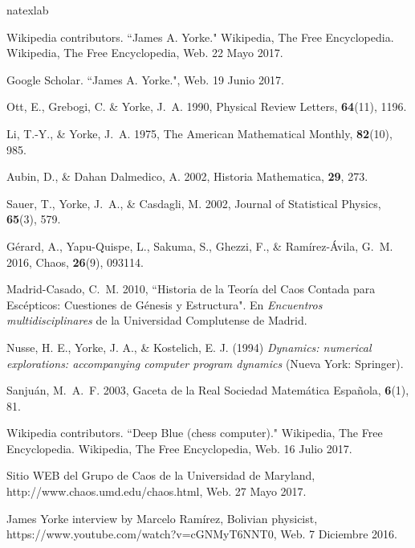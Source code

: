 \documentclass{rbf}
\begin{document}
\begin{thebibliography}{32}
\expandafter\ifx\csname natexlab\endcsname\relax\def\natexlab#1{#1}\fi

Wikipedia contributors. ``James A. Yorke." Wikipedia, The Free Encyclopedia. Wikipedia, The Free Encyclopedia, Web. 22 Mayo 2017.

Google Scholar. ``James A. Yorke.", Web. 19 Junio 2017.

Ott, E., Grebogi, C. \& Yorke, J.~A. 1990, Physical Review Letters,
  \textbf{64}(11), 1196.

Li, T.-Y., \& Yorke, J.~A. 1975, The American Mathematical Monthly,
  \textbf{82}(10), 985.

Aubin, D., \& Dahan Dalmedico, A. 2002, Historia Mathematica,
  \textbf{29}, 273.

Sauer, T., Yorke, J.~A., \& Casdagli, M. 2002, Journal of Statistical Physics,
  \textbf{65}(3), 579.

Gérard, A., Yapu-Quispe, L., Sakuma, S., Ghezzi, F., \& Ramírez-Ávila, G.~M. 2016, Chaos,
  \textbf{26}(9), 093114.

Madrid-Casado, C.~M. 2010, ``Historia de la Teoría del Caos Contada para Escépticos: Cuestiones de Génesis y Estructura". En {\em Encuentros multidisciplinares} de la Universidad Complutense de Madrid.

Nusse, H. E., Yorke, J. A., \& Kostelich, E. J. (1994) {\em Dynamics: numerical explorations: accompanying computer program dynamics} (Nueva York: Springer).

Sanjuán, M.~A.~F. 2003, Gaceta de la Real Sociedad Matemática Española,
  \textbf{6}(1), 81.
  
Wikipedia contributors. ``Deep Blue (chess computer)." Wikipedia, The Free Encyclopedia. Wikipedia, The Free Encyclopedia, Web. 16 Julio 2017.

Sitio WEB del Grupo de Caos de la Universidad de Maryland, http://www.chaos.umd.edu/chaos.html, Web. 27 Mayo 2017.

James Yorke interview by Marcelo Ramírez, Bolivian physicist, https://www.youtube.com/watch?v=cGNMyT6NNT0, Web. 7 Diciembre 2016.
\end{thebibliography}
\end{document}
